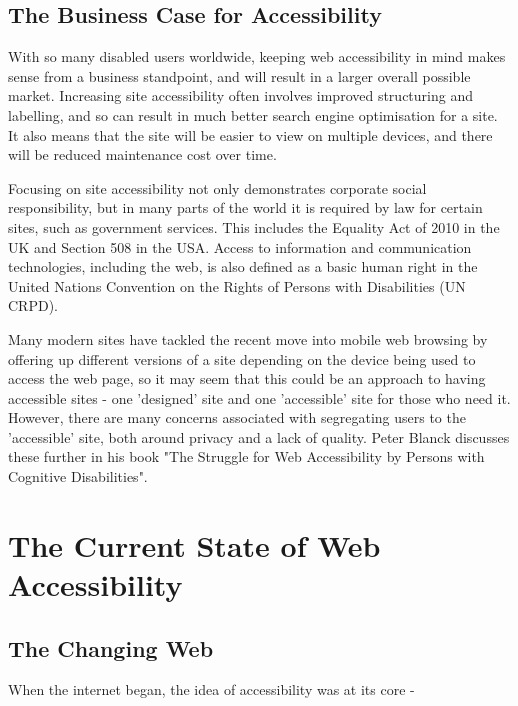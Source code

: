 \documentclass[ %
                    author={Aleena Baig},
                supervisor={Dr Simon Lock},
                    degree={BSc},
                     title={On Making Web Accessible Graphs},
                  subtitle={},
                      year={2019} ]{dissertation}
\begin{document}
\subsection{The Business Case for Accessibility}

With so many disabled users worldwide, keeping web accessibility in mind makes sense from a business standpoint, and will result in a larger overall possible market. Increasing site accessibility often involves improved structuring and labelling, and so can result in much better search engine optimisation for a site. It also means that the site will be easier to view on multiple devices, and there will be reduced maintenance cost over time.\cite{WAIaccessibilityintro}

Focusing on site accessibility not only demonstrates corporate social responsibility, but in many parts of the world it is required by law for certain sites, such as government services. This includes the Equality Act of 2010 in the UK and Section 508 in the USA. Access to information and communication technologies, including the web, is also defined as a basic human right in the United Nations Convention on the Rights of Persons with Disabilities (UN CRPD).\cite{accessibilityUN}

Many modern sites have tackled the recent move into mobile web browsing by offering up different versions of a site depending on the device being used to access the web page, so it may seem that this could be an approach to having accessible sites - one 'designed' site and one 'accessible' site for those who need it. However, there are many concerns associated with segregating users to the 'accessible' site, both around privacy and a lack of quality. Peter Blanck discusses these further in his book "The Struggle for Web Accessibility by Persons with Cognitive Disabilities".\cite[p.~157]{strugglewebaccessibility}

\section{The Current State of Web Accessibility}

\subsection{The Changing Web}

When the internet began, the idea of accessibility was at its core -
\end{document}
